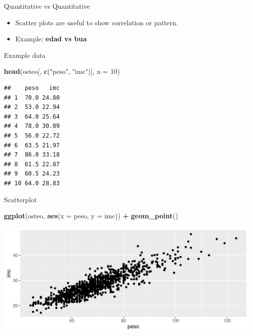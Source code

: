 \documentclass[
  ignorenonframetext,
]{beamer}
\newenvironment{Shaded}{\begin{snugshade}}{\end{snugshade}}
\newcommand{\AttributeTok}[1]{\textcolor[rgb]{0.13,0.29,0.53}{#1}}
\newcommand{\DecValTok}[1]{\textcolor[rgb]{0.00,0.00,0.81}{#1}}
\newcommand{\FunctionTok}[1]{\textcolor[rgb]{0.13,0.29,0.53}{\textbf{#1}}}
\newcommand{\NormalTok}[1]{#1}
\newcommand{\SpecialCharTok}[1]{\textcolor[rgb]{0.81,0.36,0.00}{\textbf{#1}}}
\newcommand{\StringTok}[1]{\textcolor[rgb]{0.31,0.60,0.02}{#1}}
\providecommand{\tightlist}{%
  \setlength{\itemsep}{0pt}\setlength{\parskip}{0pt}}
\begin{document}
\begin{frame}[fragile]{Quantitative vs Quantitative}
\label{quantitative-vs-quantitative}
\begin{itemize}
\tightlist
\item
  Scatter plots are useful to show correlation or pattern.
\item
  Example: \textbf{edad vs bua}
\end{itemize}

\begin{block}{Example data}
\label{example-data-1}
\begin{Shaded}
\begin{Highlighting}[]
\FunctionTok{head}\NormalTok{(osteo[, }\FunctionTok{c}\NormalTok{(}\StringTok{"peso"}\NormalTok{, }\StringTok{"imc"}\NormalTok{)], }\AttributeTok{n =} \DecValTok{10}\NormalTok{)}
\end{Highlighting}
\end{Shaded}

\begin{verbatim}
##    peso   imc
## 1  70.0 24.80
## 2  53.0 22.94
## 3  64.0 25.64
## 4  78.0 30.09
## 5  56.0 22.72
## 6  63.5 21.97
## 7  86.0 33.18
## 8  61.5 22.87
## 9  60.5 24.23
## 10 64.0 28.83
\end{verbatim}
\end{block}
\end{frame}

\begin{frame}[fragile]{Scatterplot}
\label{scatterplot}
\begin{Shaded}
\begin{Highlighting}[]
\FunctionTok{ggplot}\NormalTok{(osteo, }\FunctionTok{aes}\NormalTok{(}\AttributeTok{x =}\NormalTok{ peso, }\AttributeTok{y =}\NormalTok{ imc)) }\SpecialCharTok{+} 
  \FunctionTok{geom\_point}\NormalTok{()}
\end{Highlighting}
\end{Shaded}

\includegraphics{StatisticsWithR-3-Exploratory_Analysis_II_And_Graphics_files/figure-beamer/unnamed-chunk-15-1.pdf}
\end{frame}
\end{document}
